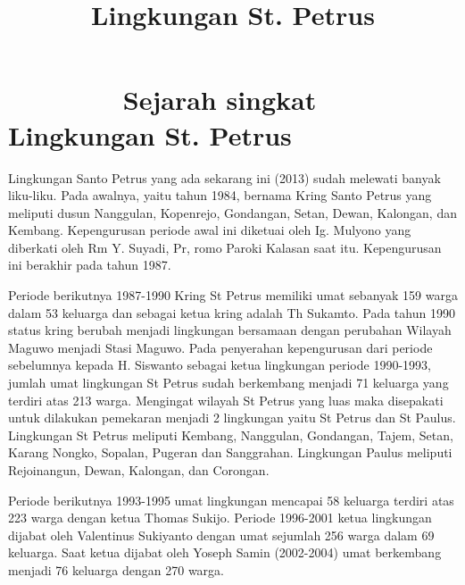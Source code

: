 \documentclass{article}
\title{Lingkungan St. Petrus}
\begin{document}
\section[\ \ \ \ \ \ \ \ Sejarah singkat Lingkungan St.
Petrus]{\ \ \ \ \ \ \ \ Sejarah singkat Lingkungan St. Petrus}
\begin{figure}

\end{figure}
\begin{figure}

\end{figure}
\begin{figure}

\end{figure}
Lingkungan Santo Petrus yang ada sekarang ini (2013) sudah melewati
banyak liku-liku. Pada awalnya, yaitu tahun 1984, bernama Kring Santo
Petrus yang meliputi dusun Nanggulan, Kopenrejo, Gondangan, Setan,
Dewan, Kalongan, dan Kembang. Kepengurusan periode awal ini diketuai
oleh Ig. Mulyono yang diberkati oleh Rm Y. Suyadi, Pr, romo Paroki
Kalasan saat itu. Kepengurusan ini berakhir pada tahun 1987.

Periode berikutnya 1987-1990 Kring St Petrus memiliki umat sebanyak 159
warga dalam 53 keluarga dan sebagai ketua kring adalah Th Sukamto. Pada
tahun 1990 status kring berubah menjadi lingkungan bersamaan dengan
perubahan Wilayah Maguwo menjadi Stasi Maguwo. Pada penyerahan
kepengurusan dari periode sebelumnya kepada H. Siswanto sebagai ketua
lingkungan periode 1990-1993, jumlah umat lingkungan St Petrus sudah
berkembang menjadi 71 keluarga yang terdiri atas 213 warga. Mengingat
wilayah St Petrus yang luas maka disepakati untuk dilakukan pemekaran
menjadi 2 lingkungan yaitu St Petrus dan St Paulus. Lingkungan St
Petrus meliputi Kembang, Nanggulan, Gondangan, Tajem, Setan, Karang
Nongko, Sopalan, Pugeran dan Sanggrahan. Lingkungan Paulus meliputi
Rejoinangun, Dewan, Kalongan, dan Corongan.

Periode berikutnya 1993-1995 umat lingkungan mencapai 58 keluarga
terdiri atas 223 warga dengan ketua Thomas Sukijo. Periode 1996-2001
ketua lingkungan dijabat oleh Valentinus Sukiyanto dengan umat sejumlah
256 warga dalam 69 keluarga. Saat ketua dijabat oleh Yoseph Samin
(2002-2004) umat berkembang menjadi 76 keluarga dengan 270 warga.
\end{document}
